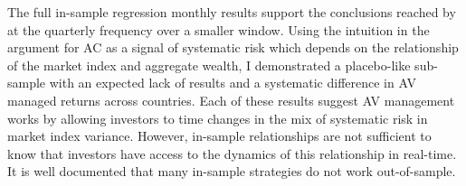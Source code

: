 The full in-sample regression monthly results support the conclusions reached by \citet{pollet_average_2010} at the quarterly frequency over a smaller window. Using the intuition in the argument for AC as a signal of systematic risk which depends on the relationship of the market index and aggregate wealth, I demonstrated a placebo-like sub-sample with an expected lack of results and a systematic difference in AV managed returns across countries. Each of these results suggest AV management works by allowing investors to time changes in the mix of systematic risk in market index variance. However, in-sample relationships are not sufficient to know that investors have access to the dynamics of this relationship in real-time. It is well documented that many in-sample strategies do not work out-of-sample.